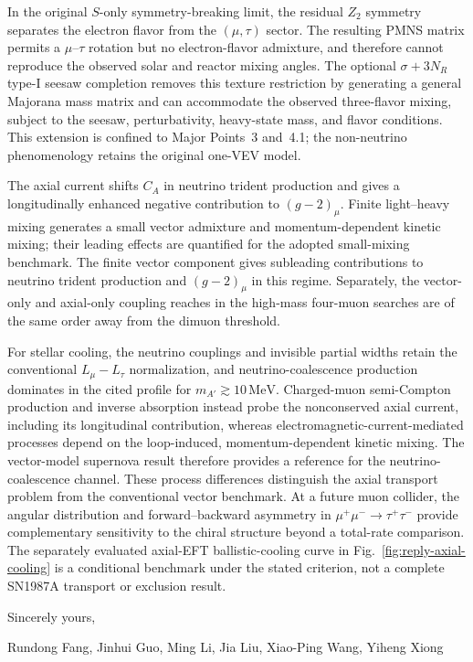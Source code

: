 \documentclass[12pt,a4paper]{article}
\begin{document}
In the original \(S\)-only symmetry-breaking limit, the residual \(Z_2\) symmetry separates the electron flavor from the \((\mu,\tau)\) sector. The resulting PMNS matrix permits a \(\mu\)--\(\tau\) rotation but no electron-flavor admixture, and therefore cannot reproduce the observed solar and reactor mixing angles. The optional \(\sigma+3N_R\) type-I seesaw completion removes this texture restriction by generating a general Majorana mass matrix and can accommodate the observed three-flavor mixing, subject to the seesaw, perturbativity, heavy-state mass, and flavor conditions. This extension is confined to Major Points~3 and~4.1; the non-neutrino phenomenology retains the original one-VEV model.

The axial current shifts \(C_A\) in neutrino trident production and gives a longitudinally enhanced negative contribution to \((g-2)_\mu\). Finite light--heavy mixing generates a small vector admixture and momentum-dependent kinetic mixing; their leading effects are quantified for the adopted small-mixing benchmark. The finite vector component gives subleading contributions to neutrino trident production and \((g-2)_\mu\) in this regime. Separately, the vector-only and axial-only coupling reaches in the high-mass four-muon searches are of the same order away from the dimuon threshold.

For stellar cooling, the neutrino couplings and invisible partial widths retain the conventional \(L_\mu-L_\tau\) normalization, and neutrino-coalescence production dominates in the cited profile for \(m_{A'}\gtrsim10\,\mathrm{MeV}\). Charged-muon semi-Compton production and inverse absorption instead probe the nonconserved axial current, including its longitudinal contribution, whereas electromagnetic-current-mediated processes depend on the loop-induced, momentum-dependent kinetic mixing. The vector-model supernova result therefore provides a reference for the neutrino-coalescence channel. These process differences distinguish the axial transport problem from the conventional vector benchmark. At a future muon collider, the angular distribution and forward--backward asymmetry in \(\mu^+\mu^-\to\tau^+\tau^-\) provide complementary sensitivity to the chiral structure beyond a total-rate comparison. The separately evaluated axial-EFT ballistic-cooling curve in Fig.~\ref{fig:reply-axial-cooling} is a conditional benchmark under the stated criterion, not a complete SN1987A transport or exclusion result.

\noindent Sincerely yours,

\noindent Rundong Fang, Jinhui Guo, Ming Li, Jia Liu, Xiao-Ping Wang, Yiheng Xiong



\end{document}
